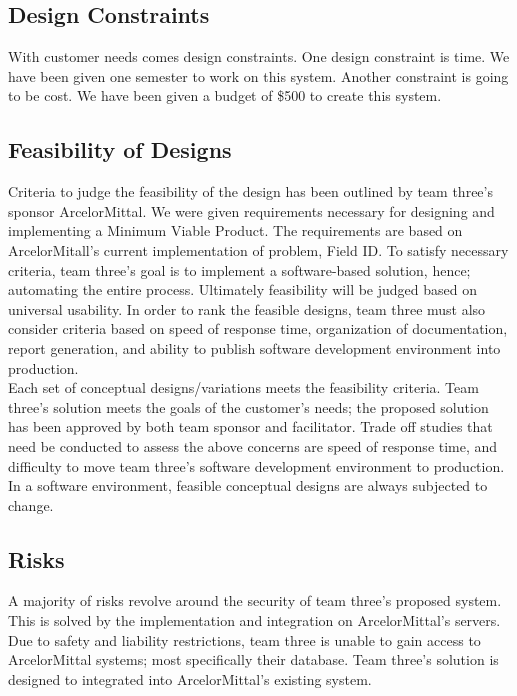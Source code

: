 \documentclass[Letter,11pt]{article}
\begin{document}
	\subsection{Design Constraints}
	With customer needs comes design constraints. One design constraint is time. We have been given one semester to work on this system. Another constraint is going to be cost. We have been given a budget of \$500 to create this system.\\ 
	\subsection{Feasibility of Designs}
	Criteria to judge the feasibility of the design has been outlined by team three's sponsor ArcelorMittal. We were given requirements necessary for designing and implementing a Minimum Viable Product. The requirements are based on ArcelorMitall's current implementation of problem, Field ID. To satisfy necessary criteria, team three's goal is to implement a software-based solution, hence; automating the entire process. Ultimately feasibility will be judged based on universal usability. In order to rank the feasible designs, team three must also consider criteria based on speed of response time, organization of documentation, report generation, and ability to publish software development environment into production. \\
	Each set of conceptual designs/variations meets the feasibility criteria. Team three's solution meets the goals of the customer's needs; the proposed solution has been approved by both team sponsor and facilitator. Trade off studies that need be conducted to assess the above concerns are speed of response time, and difficulty to move team three's software development environment to production. In a software environment, feasible conceptual designs are always subjected to change. \\
	\subsection{Risks}
	A majority of risks revolve around the security of team three's proposed system. This is solved by the implementation and integration on ArcelorMittal's servers. Due to safety and liability restrictions, team three is unable to gain access to ArcelorMittal systems; most specifically their database. Team three's solution is designed to integrated into ArcelorMittal's existing system. \\
\end{document}
